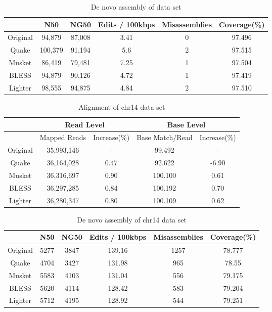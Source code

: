 \documentclass{bmcart}
\begin{document}
\begin{backmatter}
\begin{table}[h!] %
\caption{De novo assembly of \ecoli data set}
\begin{tabular}{|c|c|c|c|c|c|} \hline
	 	& N50 &	NG50	 & Edits / 100kbps&	Misassemblies	& Coverage(\%) \\ \hline
Original &	94,879 &	87,008	& 3.41	& 0	& 97.496  \\ \hline
Quake	& 100,379 &	91,194	& 5.6	& 2	 & 97.515  \\ \hline
Musket	& 86,419  &	79,481	& 7.25	& 1	 & 97.504  \\ \hline
BLESS	& 94,879  &	90,126	& 4.72	& 1	& 97.419  \\ \hline
Lighter	& 98,555  &	94,875	& 4.84	& 2	& 97.510  \\ \hline

\end{tabular}
\end{table}


\begin{table}[h!]%
\caption{Alignment of chr14 data set}
\begin{tabular}{|c|c|c||c|c|}\hline
  & \multicolumn{2}{|c||}{Read Level} & \multicolumn{2}{|c|}{Base Level} \\ \hline
  & Mapped Reads  &Increase(\%) & Base Match/Read	& Increase(\%) \\ \hline
Original & 35,993,146	&- 		&	99.492	& - \\ \hline
Quake 	& 36,164,028	& 0.47 &	92.622	& -6.90 \\ \hline
Musket 	&	36,316,697	& 0.90	& 100.100	& 0.61 \\ \hline
BLESS 	&36,297,285	& 0.84	& 100.192	&	0.70 \\ \hline
Lighter	&36,280,347	& 0.80	& 100.109	& 0.62 \\ \hline
\end{tabular}
\end{table}

\begin{table}[h!] %
\caption{De novo assembly of chr14 data set}
\begin{tabular}{|c|c|c|c|c|c|} \hline
	   & N50 &	NG50	& Edits / 100kbps &	Misassemblies	& Coverage(\%) \\ \hline
Original &	5277	&3847	&139.16	&1257	&78.777 \\ \hline
Quake	&	4704	&3427	&131.98	&965	&78.55 \\ \hline
Musket	&	5583	&4103	&131.04	&556	&79.175 \\ \hline
BLESS	&	5620	&4114	&128.42	&583	&79.204 \\ \hline
Lighter	&	5712	&4195	&128.92	&544	&79.251 \\ \hline
\end{tabular}
\end{table}


\end{backmatter}
\end{document}
